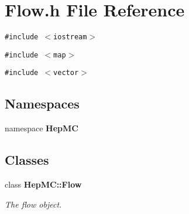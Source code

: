 \section{Flow.h File Reference}
\label{Flow_8h}
{\tt \#include $<$iostream$>$}\par
{\tt \#include $<$map$>$}\par
{\tt \#include $<$vector$>$}\par
\subsection*{Namespaces}
\begin{CompactItemize}
\item 
namespace {\bf Hep\-MC}
\end{CompactItemize}
\subsection*{Classes}
\begin{CompactItemize}
\item 
class {\bf Hep\-MC::Flow}
\begin{CompactList}\small\item\em The flow object. \item\end{CompactList}\end{CompactItemize}
